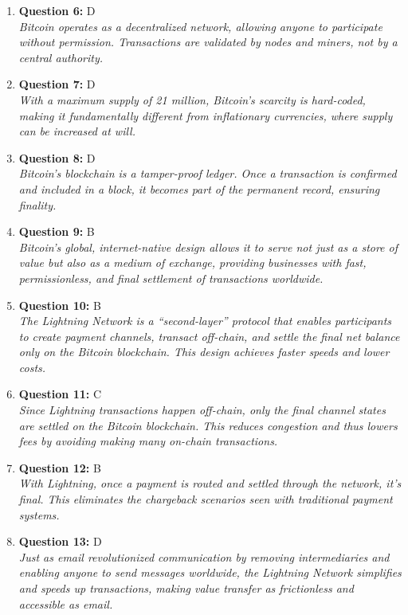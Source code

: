 \documentclass[12pt,a4paper]{article}
\begin{document}
\begin{enumerate}
\item \textbf{Question 6:} D
\\ \textit{Bitcoin operates as a decentralized network, allowing anyone to participate without permission. Transactions are validated by nodes and miners, not by a central authority.}

\item \textbf{Question 7:} D
\\ \textit{With a maximum supply of 21 million, Bitcoin’s scarcity is hard-coded, making it fundamentally different from inflationary currencies, where supply can be increased at will.}

\item \textbf{Question 8:} D
\\ \textit{Bitcoin's blockchain is a tamper-proof ledger. Once a transaction is confirmed and included in a block, it becomes part of the permanent record, ensuring finality.}

\item \textbf{Question 9:} B
\\ \textit{Bitcoin's global, internet-native design allows it to serve not just as a store of value but also as a medium of exchange, providing businesses with fast, permissionless, and final settlement of transactions worldwide.}

\item \textbf{Question 10:} B
\\ \textit{The Lightning Network is a “second-layer” protocol that enables participants to create payment channels, transact off-chain, and settle the final net balance only on the Bitcoin blockchain. This design achieves faster speeds and lower costs.}

\item \textbf{Question 11:} C
\\ \textit{Since Lightning transactions happen off-chain, only the final channel states are settled on the Bitcoin blockchain. This reduces congestion and thus lowers fees by avoiding making many on-chain transactions.}

\item \textbf{Question 12:} B
\\ \textit{With Lightning, once a payment is routed and settled through the network, it’s final. This eliminates the chargeback scenarios seen with traditional payment systems.}

\item \textbf{Question 13:} D
\\ \textit{Just as email revolutionized communication by removing intermediaries and enabling anyone to send messages worldwide, the Lightning Network simplifies and speeds up transactions, making value transfer as frictionless and accessible as email.}


\end{enumerate}
\end{document}
